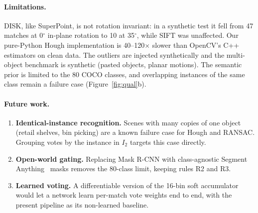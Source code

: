 \documentclass{article}
\begin{document}
\paragraph{Limitations.} DISK, like SuperPoint, is not rotation invariant:
in a synthetic test it fell from 47 matches at 0$^\circ$ in-plane rotation to
10 at 35$^\circ$, while SIFT was unaffected. Our pure-Python Hough
implementation is 40--120$\times$ slower than OpenCV's C++ estimators on
clean data. The outliers are injected synthetically and the multi-object
benchmark is synthetic (pasted objects, planar motions). The semantic prior is
limited to the 80 COCO classes, and overlapping instances of the same class
remain a failure case (Figure~\ref{fig:qual}b).

\paragraph{Future work.}
\begin{enumerate}
  \item \textbf{Identical-instance recognition.} Scenes with many copies of
  one object (retail shelves, bin picking) are a known failure case for
  Hough and RANSAC. Grouping votes by the instance in $I_2$ targets this case
  directly.
  \item \textbf{Open-world gating.} Replacing Mask R-CNN with class-agnostic
  Segment Anything~\cite{kirillov2023sam} masks removes the 80-class limit,
  keeping rules R2 and R3.
  \item \textbf{Learned voting.} A differentiable version of the 16-bin soft
  accumulator would let a network learn per-match vote weights end to end,
  with the present pipeline as its non-learned baseline.
\end{enumerate}



\end{document}
